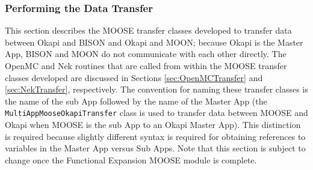 \documentclass[10pt]{article}
\newcommand{\beq}{\begin{equation}}
\newcommand{\eeq}{\end{equation}}
\newcounter{subsubsubsection}[subsubsection]
\numberwithin{equation}{section} %
\begin{document}

\subsubsection{Performing the Data Transfer}
This section describes the MOOSE transfer classes developed to transfer data between Okapi and BISON and Okapi and MOON; because Okapi is the Master App, BISON and MOON do not communicate with each other directly. The OpenMC and Nek routines that are called from within the MOOSE transfer classes developed are discussed in Sections \ref{sec:OpenMCTransfer} and \ref{sec:NekTransfer}, respectively. The convention for naming these transfer classes is the name of the sub App followed by the name of the Master App (the {\tt MultiAppMooseOkapiTransfer} class is used to transfer data between MOOSE and Okapi when MOOSE is the sub App to an Okapi Master App). This distinction is required because slightly different syntax is required for obtaining references to variables in the Master App versus Sub Apps. Note that this section is subject to change once the Functional Expansion MOOSE module is complete.
\end{document}
